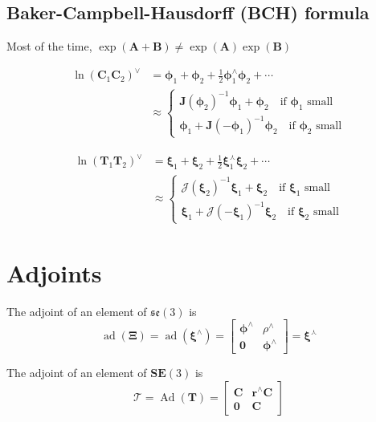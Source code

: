 \documentclass[12pt,landscape,a4paper]{article}
\newcommand{\SE}{\mathrm{\mathbf{SE}}}
\newcommand{\se}{\mathfrak{se}}
\newcommand{\vzero}{\bm{0}}
\newcommand{\C}{\bm{C}}
\newcommand{\T}{\bm{T}}
\newcommand{\aT}{\bm{\mathcal{T}}}
\newcommand{\J}{\bm{J}}
\newcommand{\Jc}{\bm{\mathcal{J}}}
\newcommand{\bphi}{\bm{\phi}}
\newcommand{\bxi}{\bm{\xi}}
\newcommand{\bXi}{\bm{\Xi}}
\DeclareMathOperator{\Ad}{Ad}
\DeclareMathOperator{\ad}{ad}
\begin{document}
\begin{multicols*}{3}
\subsection*{Baker-Campbell-Hausdorff (BCH) formula}
Most of the time, $\exp(\mathbf{A}+\mathbf{B}) \not= \exp(\mathbf{A})\exp(\mathbf{B})$

	$$\begin{aligned} \ln(\C_1\C_2)^\vee%
	&= \bphi_1 + \bphi_2 + \frac12 \bphi_1^\wedge\bphi_2 + \cdots \\%
	&\approx
	\begin{cases}
		\J(\bphi_2)^{-1}\bphi_1 + \bphi_2 \quad\text{if $\bphi_1$ small} \\
		\bphi_1 + \J(-\bphi_1)^{-1}\bphi_2  \quad\text{if $\bphi_2$ small}
	\end{cases}
	\end{aligned}$$

	$$\begin{aligned} \ln(\T_1\T_2)^\vee%
	&= \bxi_1 + \bxi_2 + \frac12 \bxi_1^\curlywedge\bxi_2 + \cdots \\%
	&\approx
	\begin{cases}
		\Jc(\bxi_2)^{-1}\bxi_1 + \bxi_2 \quad\text{if $\bxi_1$ small} \\
		\bxi_1 + \Jc(-\bxi_1)^{-1}\bxi_2  \quad\text{if $\bxi_2$ small}
	\end{cases}
	\end{aligned}$$

\section{Adjoints}
	The adjoint of an element of $\se(3)$ is
	$$ \ad(\bXi) = \ad(\bxi^\wedge) = %
	\begin{bmatrix}
		\bphi^\wedge & \rho^\wedge \\
		\vzero & \bphi^\wedge
	\end{bmatrix} = 
	\bxi^\curlywedge$$

	The adjoint of an element of $\SE(3)$ is
	$$ \aT = \Ad(\T) =%
	\begin{bmatrix}
		\C & \mathbf{r}^\wedge\C \\
		\vzero & \C
	\end{bmatrix}$$


\end{multicols*}
\end{document}
